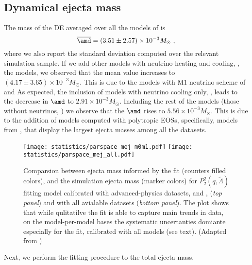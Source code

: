 
\subsection{Dynamical ejecta mass}

The mass of the \ac{DE} averaged over all the models of \DSrefset{} is 
%
\begin{equation}
\label{eq:ejecta:dyn:avg:M}
\overline{\amd} = (3.51 \pm 2.57)\times 10^{-3}M_{\odot}\ ,
\end{equation}
%
where we also report the standard deviation computed over the relevant simulation sample.
If we add other models with neutrino heating and cooling, \ie, the \DSheatcool{} models,
we observed that the mean value increases to $(4.17 \pm 3.65)\times 10^{-3}M_{\odot}$.
This is due to the models with M$1$ neutrino scheme of \citet{Vincent:2019kor} and 
\citet{Sekiguchi:2016bjd}
%
As expected, the inclusion of models with neutrino cooling only, \DScool{}, 
leads to the decrease in $\amd$ to $2.91\times 10^{-3}M_{\odot}$.
%
Including the rest of the models (those without neutrinos, \DSnone{}) we observe 
that the $\amd$ rises to $5.56\times 10^{-3}M_{\odot}$. This is due to the addition 
of models computed with polytropic \acp{EOS}, specifically, models from 
\citet{Dietrich:2016hky}, that display the largest ejecta masses among all the datasets.
%
\begin{figure}[t]
    \centering 
    \texttt{[image: statistics/parspace\_mej\_m0m1.pdf]}
    \texttt{[image: statistics/parspace\_mej\_all.pdf]}
    \caption{
        Comparsion between ejecta mass informed by the fit (counters filled colors), 
        and the simulation ejecta mass (marker colors) for $P_2^2(q,\tilde{\Lambda})$ 
        fitting model calibrated with advanced-physics datasets, 
        \DSrefset{} and \DSheatcool{}, (\textit{top panel}) and with all 
        avialable datasets (\textit{bottom panel}).
        The plot shows that while qulitatilve the fit is able to capture main trends 
        in data, on the model-per-model bases the systematic uncertanties domiante 
        especially for the fit, calibrated with all models (see text).
        (Adapted from \citet{Nedora:2020qtd})
    }
    \label{fig:mej_parspace}
\end{figure}
%
Next, we perform the fitting procedure to the total ejecta mass. 
